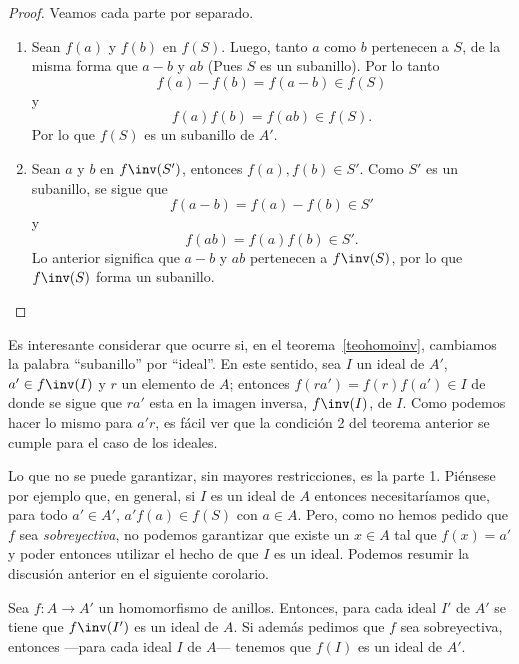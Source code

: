 \begin{proof} Veamos cada parte por separado.
	\begin{enumerate}
		\item Sean $ f(a) $ y $ f(b) $ en $ f(S) $. Luego, tanto $ a $ como $ b  $ pertenecen a $ S $, de la misma forma que $ a-b $ y $ ab $ (Pues $ S $ es un subanillo). Por lo tanto
		\[ f(a) - f(b) = f(a-b) \in f(S) \]
		y
		\[ f(a)f(b) = f(ab) \in f(S). \]
		Por lo que $ f(S) $ es un subanillo de $ A' $.
		\item Sean $ a $ y $ b $ en $ f\inv (S')$, entonces $ f(a),f(b)\in S' $. Como $ S' $ es un subanillo, se sigue que
		\[ f(a-b) = f(a) - f(b) \in S'\] 
		y
		\[ f(ab) = f(a)f(b)\in S'. \] 
		Lo anterior significa que $ a-b $ y $ ab $ pertenecen a $ f\inv(S) $, por lo que $ f\inv(S) $ forma un subanillo.
	\end{enumerate}
\end{proof}
Es interesante considerar que ocurre si, en el teorema~\ref{teohomoinv}, cambiamos la palabra ``subanillo'' por ``ideal''. En este sentido, sea $I$ un ideal de $A'$, $a'\in f\inv(I)$ y $r$ un elemento de $A$; entonces $f(ra') = f(r)f(a') \in I$ de donde se sigue que $ra'$ esta en la imagen inversa, $f\inv(I)$, de $I$. Como podemos hacer lo mismo para $a'r$, es fácil ver que la condición 2 del teorema anterior se cumple para el caso de los ideales.

Lo que no se puede garantizar, sin mayores restricciones, es la parte 1. Piénsese por ejemplo que, en general, si $I$ es un ideal de $A$ entonces necesitaríamos que, para todo $a'\in A'$, $a'f(a) \in f(S)$ con $a\in A$. Pero, como no hemos pedido que $f$ sea \textit{sobreyectiva}, no podemos garantizar que existe un $x\in A$ tal que $f(x) = a'$ y poder entonces utilizar el hecho de que $I$ es un ideal. Podemos resumir la discusión anterior en el siguiente corolario.
\begin{cor} \label{Cor-imagen-inversa}
	Sea $f\colon  A\to A'$ un homomorfismo de anillos. Entonces, para cada ideal $I'$ de $A'$ se tiene que $f\inv(I')$ es un ideal de $A$. Si además pedimos que $f$ sea sobreyectiva, entonces ---para cada ideal $I$ de $A$--- tenemos que $f(I)$ es un ideal de $A'$.
\end{cor}
